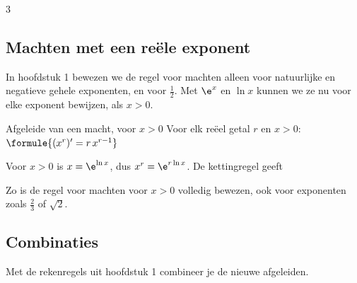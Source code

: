 \begin{alleenvoor}{3}
\subsection{Machten met een reële exponent}

In hoofdstuk 1 bewezen we de regel voor machten alleen voor natuurlijke en negatieve gehele exponenten, en voor $\frac12$. Met $\e^x$ en $\ln x$ kunnen we ze nu voor elke exponent bewijzen, als $x > 0$.

\begin{theorie}
\begin{stelling}{Afgeleide van een macht, voor \texorpdfstring{$x > 0$}{x > 0}}
Voor elk reëel getal $r$ en $x > 0$: \quad $\formule{(x^r)' = r\,x^{r - 1}}$
\end{stelling}
\begin{bewijs}
Voor $x > 0$ is $x = \e^{\ln x}$, dus $x^r = \e^{r \ln x}$. De kettingregel geeft
\end{bewijs}
\end{theorie}

Zo is de regel voor machten voor $x > 0$ volledig bewezen, ook voor exponenten zoals $\frac23$ of $\sqrt2$.

\end{alleenvoor}
\subsection{Combinaties}

Met de rekenregels uit hoofdstuk 1 combineer je de nieuwe afgeleiden.



